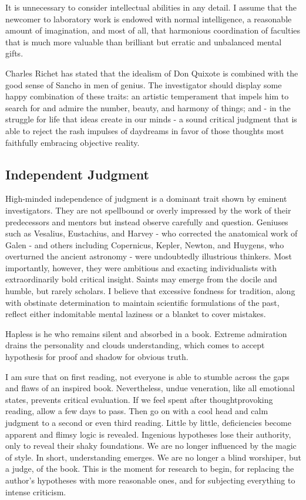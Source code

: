 \documentclass{article}
\begin{document}
It is unnecessary to consider intellectual abilities in any detail. I assume that the newcomer to laboratory work is endowed with normal intelligence, a reasonable amount of imagination, and most of all, that harmonious coordination of faculties that is much more valuable than brilliant but erratic and unbalanced mental gifts.

Charles Richet has stated that the idealism of Don Quixote is combined with the good sense of Sancho in men of genius. The investigator should display some happy combination of these traits: an artistic temperament that impels him to search for and admire the number, beauty, and harmony of things; and - in the struggle for life that ideas create in our minds - a sound critical judgment that is able to reject the rash impulses of daydreams in favor of those thoughts most faithfully embracing objective reality.

\subsection*{Independent Judgment}

High-minded independence of judgment is a dominant trait shown by eminent investigators. They are not spellbound or overly impressed by the work of their predecessors and mentors but instead observe carefully and question. Geniuses such as Vesalius, Eustachius, and Harvey - who corrected the anatomical work of Galen - and others including Copernicus, Kepler, Newton, and Huygens, who overturned the ancient astronomy - were undoubtedly illustrious thinkers. Most importantly, however, they were ambitious and exacting individualists with extraordinarily bold critical insight. Saints may emerge from the docile and humble, but rarely scholars. I believe that excessive fondness for tradition, along with obstinate determination to maintain scientific formulations of the past, reflect either indomitable mental laziness or a blanket to cover mistakes.

Hapless is he who remains silent and absorbed in a book. Extreme admiration drains the personality and clouds understanding, which comes to accept hypothesis for proof and shadow for obvious truth.

I am sure that on first reading, not everyone is able to stumble across the gaps and flaws of an inspired book. Nevertheless, undue veneration, like all emotional states, prevents critical evaluation. If we feel spent after thoughtprovoking reading, allow a few days to pass. Then go on with a cool head and calm judgment to a second or even third reading. Little by little, deficiencies become apparent and flimsy logic is revealed. Ingenious hypotheses lose their authority, only to reveal their shaky foundations. We are no longer influenced by the magic of style. In short, understanding emerges. We are no longer a blind worshiper, but a judge, of the book. This is the moment for research to begin, for replacing the author’s hypotheses with more reasonable ones, and for subjecting everything to intense criticism.
\end{document}
